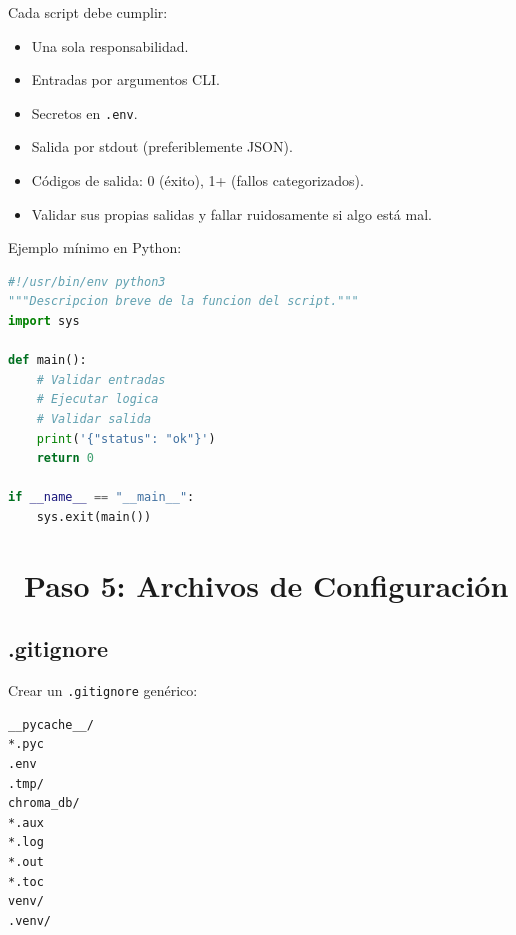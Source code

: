 \documentclass[11pt,a4paper]{article}
\newcommand{\iconotexto}[2]{\textcolor{cyanNeon}{\faIcon{#1}}~#2}
\begin{document}
Cada script debe cumplir:

\begin{tcolorbox}[tarjetaIcono, title={Requisitos de un script}]
\begin{itemize}[leftmargin=*]
    \item Una sola responsabilidad.
    \item Entradas por argumentos CLI.
    \item Secretos en \texttt{.env}.
    \item Salida por stdout (preferiblemente JSON).
    \item Códigos de salida: 0 (éxito), 1+ (fallos categorizados).
    \item Validar sus propias salidas y fallar ruidosamente si algo está mal.
\end{itemize}
\end{tcolorbox}

Ejemplo mínimo en Python:

\begin{tcolorbox}[cajaContenido, title={Plantilla de script}]
\begin{lstlisting}[language=Python]
#!/usr/bin/env python3
"""Descripcion breve de la funcion del script."""
import sys

def main():
    # Validar entradas
    # Ejecutar logica
    # Validar salida
    print('{"status": "ok"}')
    return 0

if __name__ == "__main__":
    sys.exit(main())
\end{lstlisting}
\end{tcolorbox}

\section[Paso 5 --- Archivos de Configuración]{\iconotexto{wrench}{Paso 5: Archivos de Configuración}}

\subsection{.gitignore}
Crear un \texttt{.gitignore} genérico:

\begin{tcolorbox}[cajaContenido, title={\texttt{.gitignore}}]
\begin{lstlisting}
__pycache__/
*.pyc
.env
.tmp/
chroma_db/
*.aux
*.log
*.out
*.toc
venv/
.venv/
\end{lstlisting}
\end{tcolorbox}
\end{document}
